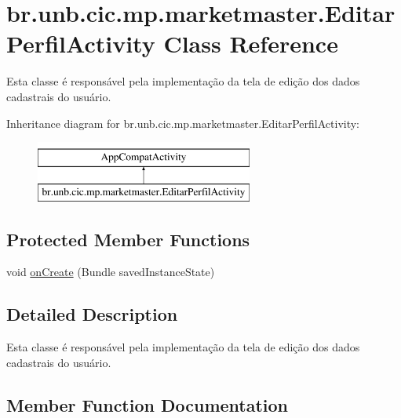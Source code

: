 \hypertarget{classbr_1_1unb_1_1cic_1_1mp_1_1marketmaster_1_1EditarPerfilActivity}{}\section{br.\+unb.\+cic.\+mp.\+marketmaster.\+Editar\+Perfil\+Activity Class Reference}
\label{classbr_1_1unb_1_1cic_1_1mp_1_1marketmaster_1_1EditarPerfilActivity}


Esta classe é responsável pela implementação da tela de edição dos dados cadastrais do usuário.  


Inheritance diagram for br.\+unb.\+cic.\+mp.\+marketmaster.\+Editar\+Perfil\+Activity\+:\begin{figure}[H]
\begin{center}
\leavevmode
\includegraphics[height=2.000000cm]{classbr_1_1unb_1_1cic_1_1mp_1_1marketmaster_1_1EditarPerfilActivity}
\end{center}
\end{figure}
\subsection*{Protected Member Functions}
\begin{DoxyCompactItemize}
\item 
void \mbox{\hyperlink{classbr_1_1unb_1_1cic_1_1mp_1_1marketmaster_1_1EditarPerfilActivity_aa2af1707d86e418d8d8f7e99d1646b21}{on\+Create}} (Bundle saved\+Instance\+State)
\end{DoxyCompactItemize}


\subsection{Detailed Description}
Esta classe é responsável pela implementação da tela de edição dos dados cadastrais do usuário. 

\subsection{Member Function Documentation}
\mbox{\label{classbr_1_1unb_1_1cic_1_1mp_1_1marketmaster_1_1EditarPerfilActivity_aa2af1707d86e418d8d8f7e99d1646b21}} 
